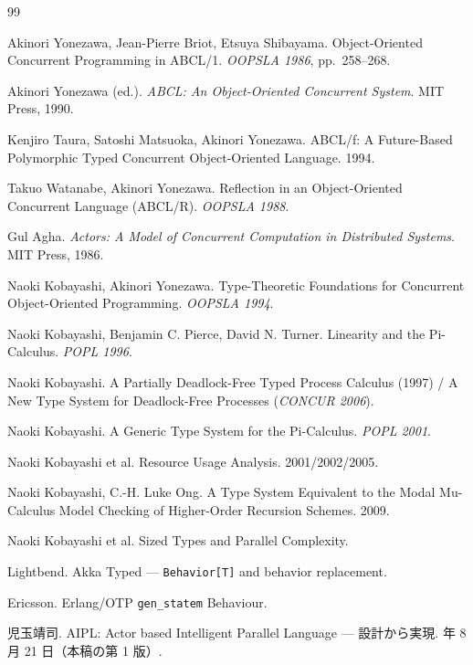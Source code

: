 \documentclass[11pt,a4paper]{ltjsarticle}
\theoremstyle{definition}
\theoremstyle{remark}
\begin{document}
\begin{thebibliography}{99}

Akinori Yonezawa, Jean-Pierre Briot, Etsuya Shibayama.
\newblock Object-Oriented Concurrent Programming in ABCL/1.
\newblock \emph{OOPSLA 1986}, pp.~258--268.

Akinori Yonezawa (ed.).
\newblock \emph{ABCL: An Object-Oriented Concurrent System}. MIT Press, 1990.

Kenjiro Taura, Satoshi Matsuoka, Akinori Yonezawa.
\newblock ABCL/f: A Future-Based Polymorphic Typed Concurrent
Object-Oriented Language. 1994.

Takuo Watanabe, Akinori Yonezawa.
\newblock Reflection in an Object-Oriented Concurrent Language (ABCL/R).
\newblock \emph{OOPSLA 1988}.

Gul Agha.
\newblock \emph{Actors: A Model of Concurrent Computation in Distributed
Systems}. MIT Press, 1986.

Naoki Kobayashi, Akinori Yonezawa.
\newblock Type-Theoretic Foundations for Concurrent Object-Oriented Programming.
\newblock \emph{OOPSLA 1994}.

Naoki Kobayashi, Benjamin C. Pierce, David N. Turner.
\newblock Linearity and the Pi-Calculus. \emph{POPL 1996}.

Naoki Kobayashi.
\newblock A Partially Deadlock-Free Typed Process Calculus (1997) /
A New Type System for Deadlock-Free Processes (\emph{CONCUR 2006}).

Naoki Kobayashi.
\newblock A Generic Type System for the Pi-Calculus. \emph{POPL 2001}.

Naoki Kobayashi et al.
\newblock Resource Usage Analysis. 2001/2002/2005.

Naoki Kobayashi, C.-H. Luke Ong.
\newblock A Type System Equivalent to the Modal Mu-Calculus Model Checking
of Higher-Order Recursion Schemes. 2009.

Naoki Kobayashi et al.
\newblock Sized Types and Parallel Complexity.

Lightbend.
\newblock Akka Typed --- \texttt{Behavior[T]} and behavior replacement.

Ericsson.
\newblock Erlang/OTP \texttt{gen\_statem} Behaviour.

児玉靖司.
\newblock AIPL: Actor based Intelligent Parallel Language --- 設計から実現.
 年 8 月 21 日（本稿の第 1 版）.


\end{thebibliography}
\end{document}
